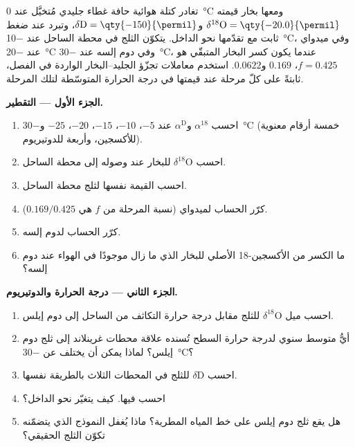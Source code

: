 \begin{problem}\label{pb:b3:stable-isotopes:1}
تغادر كتلة هوائية حافة غطاء جليدي مُتخيَّل عند \qty{0}{\celsius}
ومعها بخار قيمته $\delta^{18}\mathrm O = \qty{-20.0}{\permil}$ و$\delta\mathrm D =
\qty{-150}{\permil}$، وتبرد عند ضغط ثابت مع تقدّمها نحو الداخل.
يتكوّن الثلج في محطة الساحل عند \qty{-10}{\celsius}، وفي ميدواي عند
\qty{-20}{\celsius} وفي دوم إلسه عند \qty{-30}{\celsius}، عندما
يكون كسر البخار المتبقّي هو $f = 0.425$، $0.169$ و$0.0622$. استخدم معاملات تجزّؤ الجليد--البخار
الواردة في الفصل، ثابتةً على كلّ مرحلة عند قيمتها في درجة الحرارة
المتوسّطة لتلك المرحلة.

\medskip\noindent\textbf{الجزء الأول --- التقطير.}
\begin{enumerate}
\item احسب $\alpha^{18}$ و$\alpha^{\mathrm D}$ عند $-5$، $-10$، $-15$، $-20$،
$-25$ و\qty{-30}{\celsius} (خمسة أرقام معنوية للأكسجين، وأربعة
للدوتيريوم).
\item احسب $\delta^{18}\mathrm O$ للبخار عند وصوله إلى محطة الساحل.
\item احسب القيمة نفسها لثلج محطة الساحل.
\item كرّر الحساب لميدواي (نسبة المرحلة من $f$ هي $0.169/0.425$).
\item كرّر الحساب لدوم إلسه.
\item ما الكسر من الأكسجين-18 الأصلي للبخار الذي ما زال موجودًا
في الهواء عند دوم إلسه؟
\end{enumerate}

\medskip\noindent\textbf{الجزء الثاني --- درجة الحرارة والدوتيريوم.}
\begin{enumerate}[resume]
\item احسب ميل $\delta^{18}\mathrm O$ للثلج مقابل
درجة حرارة التكاثف من الساحل إلى دوم إيلس.
\item أيُّ متوسط سنوي لدرجة حرارة السطح تُسنده علاقة
محطات غرينلاند إلى ثلج دوم إيلس؟ لماذا يمكن أن يختلف عن
\qty{-30}{\celsius}؟
\item احسب $\delta\mathrm D$ للثلج في المحطات الثلاث بالطريقة نفسها.
\item احسب  فيها. كيف يتغيّر نحو الداخل؟
\item هل يقع ثلج دوم إيلس على خط المياه المطرية؟ ماذا يُغفل النموذج
الذي يتضمّنه تكوّن الثلج الحقيقي؟
\end{enumerate}


\end{problem}
